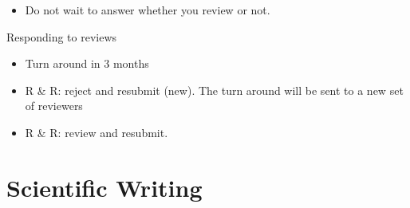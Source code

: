 \documentclass[
]{book}
\providecommand{\tightlist}{%
  \setlength{\itemsep}{0pt}\setlength{\parskip}{0pt}}
\begin{document}
\begin{itemize}
\tightlist
\item
  Do not wait to answer whether you review or not.
\end{itemize}

Responding to reviews

\begin{itemize}
\item
  Turn around in 3 months
\item
  R \& R: reject and resubmit (new). The turn around will be sent to a new set of reviewers
\end{itemize}

\begin{itemize}
\tightlist
\item
  R \& R: review and resubmit.
\end{itemize}

\hypertarget{scientific-writing}{%
\chapter{Scientific Writing}\label{scientific-writing}}
\end{document}
